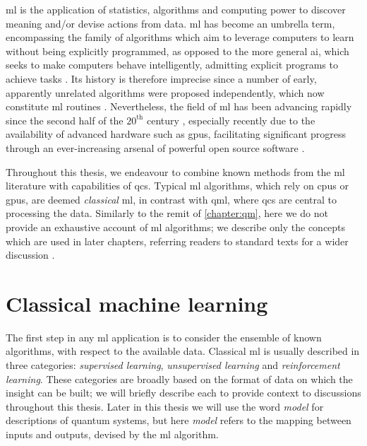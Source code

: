 
\Gls{ml} is the application of statistics, algorithms and computing power to discover meaning and/or devise actions from data.
\gls{ml} has become an umbrella term, encompassing the family of algorithms
    which aim to leverage computers to learn without being explicitly programmed,
    as opposed to the more general \gls{ai}, which seeks to make computers behave intelligently,
    admitting explicit programs to achieve tasks \cite{MLvAI}.
Its history is therefore imprecise since a number of early, apparently unrelated algorithms were proposed independently, 
    which now constitute \gls{ml} routines \cite{mcculloch1943logical, turing2009computing}. 
Nevertheless, the field of \gls{ml} has been advancing rapidly since the second half of the $20^{\textrm{th}}$ century \cite{russell2002artificial}, 
    especially recently due to the availability of advanced hardware such as \glspl{gpu}, 
    facilitating significant progress through an ever-increasing arsenal of powerful open source software \cite{pedregosa2011scikit, abadi2016tensorflow, paszke2019pytorch}. 
\par 

Throughout this thesis, we endeavour to combine known methods from the \gls{ml} literature with capabilities of \glspl{qc}\footnotemark. 
Typical \gls{ml} algorithms, which rely on \glspl{cpu} or \glspl{gpu}, are deemed \emph{classical} \acrlong{ml},
    in contrast with \gls{qml}, where \glspl{qc} are central to processing the data.
Similarly to the remit of \cref{chapter:qm}, here we do not provide an exhaustive account of \gls{ml} algorithms;
    we describe only the concepts which are used in later chapters, 
    referring readers to standard texts for a wider discussion \cite{russell2002artificial, hastie2009elements}.



\section{Classical machine learning}\label{sec:classical_ml}

The first step in any \gls{ml} application is to consider the ensemble of known algorithms, 
    with respect to the available data.
Classical \gls{ml} is usually described in three categories:
    \emph{supervised learning}, \emph{unsupervised learning} and \emph{reinforcement learning}.  
These categories are broadly based on the format of data on which the insight can be built;
    we will briefly describe each to provide context to discussions throughout this thesis. 
Later in this thesis we will use the word \emph{model} for descriptions of quantum systems, 
    but here \emph{model} refers to the mapping between inputs and outputs, devised by the \gls{ml} algorithm.
\par 

